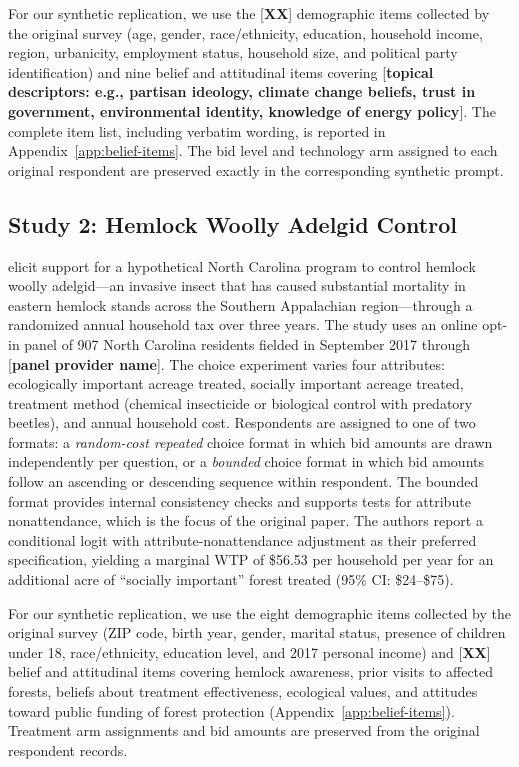 \documentclass[12pt]{article}
\begin{document}
For our synthetic replication, we use the [\textbf{XX}] demographic items collected by the original survey (age, gender, race/ethnicity, education, household income, region, urbanicity, employment status, household size, and political party identification) and nine belief and attitudinal items covering [\textbf{topical descriptors: e.g., partisan ideology, climate change beliefs, trust in government, environmental identity, knowledge of energy policy}]. The complete item list, including verbatim wording, is reported in Appendix~\ref{app:belief-items}. The bid level and technology arm assigned to each original respondent are preserved exactly in the corresponding synthetic prompt.

\subsection{Study 2: Hemlock Woolly Adelgid Control}\label{sec:data-hwa}

\textcite{Giguere2020} elicit support for a hypothetical North Carolina program to control hemlock woolly adelgid---an invasive insect that has caused substantial mortality in eastern hemlock stands across the Southern Appalachian region---through a randomized annual household tax over three years. The study uses an online opt-in panel of 907 North Carolina residents fielded in September 2017 through [\textbf{panel provider name}]. The choice experiment varies four attributes: ecologically important acreage treated, socially important acreage treated, treatment method (chemical insecticide or biological control with predatory beetles), and annual household cost. Respondents are assigned to one of two formats: a \textit{random-cost repeated} choice format in which bid amounts are drawn independently per question, or a \textit{bounded} choice format in which bid amounts follow an ascending or descending sequence within respondent. The bounded format provides internal consistency checks and supports tests for attribute nonattendance, which is the focus of the original paper. The authors report a conditional logit with attribute-nonattendance adjustment as their preferred specification, yielding a marginal WTP of \$56.53 per household per year for an additional acre of ``socially important'' forest treated (95\% CI: \$24--\$75).

For our synthetic replication, we use the eight demographic items collected by the original survey (ZIP code, birth year, gender, marital status, presence of children under 18, race/ethnicity, education level, and 2017 personal income) and [\textbf{XX}] belief and attitudinal items covering hemlock awareness, prior visits to affected forests, beliefs about treatment effectiveness, ecological values, and attitudes toward public funding of forest protection (Appendix~\ref{app:belief-items}). Treatment arm assignments and bid amounts are preserved from the original respondent records.
\end{document}

